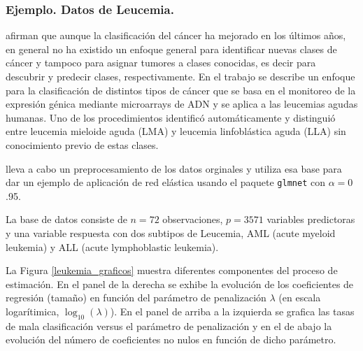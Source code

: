 \documentclass{report}
\begin{document}
 
 \subsubsection*{Ejemplo. Datos de Leucemia.} 
 
  \cite{golub1999molecular}   afirman que aunque la clasificación del cáncer ha mejorado en los últimos años, en general no ha existido un enfoque general para identificar nuevas clases de cáncer y tampoco para asignar tumores a clases conocidas, es decir para descubrir y predecir clases, respectivamente. En el trabajo se describe un enfoque para la clasificación de distintos tipos de cáncer que se basa en el monitoreo de la expresión génica mediante microarrays de ADN y se aplica a las leucemias agudas humanas.   Uno de los procedimientos identificó automáticamente y distinguió entre leucemia mieloide aguda (LMA) y leucemia linfoblástica aguda (LLA) sin conocimiento previo de estas clases.
 
 
 \cite{dettling} lleva a cabo un preprocesamiento de los datos orginales y \cite{friedman2010} utiliza esa base para dar un ejemplo de aplicación de red elástica usando el paquete \texttt{glmnet} con $\alpha=0$.95. 
 
 La base de datos consiste de $n=72$ observaciones, $p=3571$ variables predictoras y una variable respuesta con dos subtipos de Leucemia, AML (acute myeloid leukemia) y  ALL (acute lymphoblastic leukemia). 
 
 
 
La Figura 	\ref{leukemia_graficos}   muestra diferentes componentes del proceso de estimación. En el panel de la derecha se exhibe la evolución de los coeficientes de regresión (tamaño) en función del parámetro de penalización $\lambda$ (en escala logarítimica, $\log_{10}(\lambda)$).  En el panel de arriba a la izquierda se grafica las tasas de mala clasificación  versus el parámetro de penalización y en el de abajo la evolución del número de coeficientes no nulos en función de dicho parámetro.  


 



 
\end{document}
